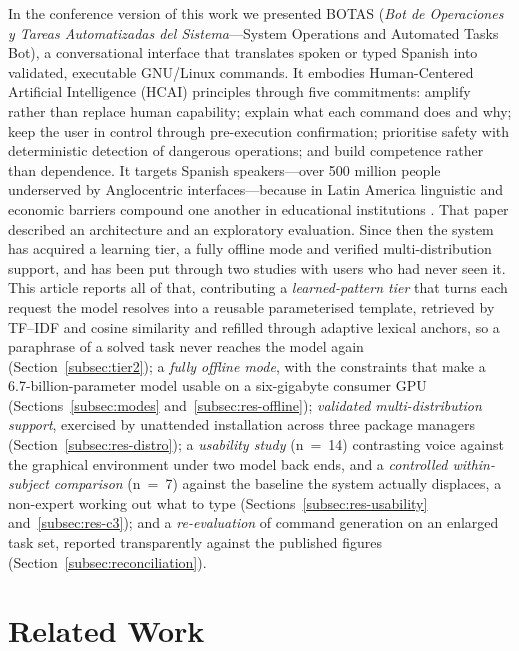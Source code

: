 \documentclass[10pt,a4paper]{article}
\begin{document}
In the conference version of this work \citep{AragonRuiz2026} we presented BOTAS (\textit{Bot de Operaciones y Tareas Automatizadas del Sistema}---System Operations and Automated Tasks Bot), a conversational interface that translates spoken or typed Spanish into validated, executable GNU/Linux commands. It embodies Human-Centered Artificial Intelligence (HCAI) principles \citep{Shneiderman2020} through five commitments: amplify rather than replace human capability; explain what each command does and why; keep the user in control through pre-execution confirmation; prioritise safety with deterministic detection of dangerous operations; and build competence rather than dependence. It targets Spanish speakers---over 500 million people underserved by Anglocentric interfaces---because in Latin America linguistic and economic barriers compound one another in educational institutions \citep{Warschauer2004, CEPAL2023}. That paper described an architecture and an exploratory evaluation. Since then the system has acquired a learning tier, a fully offline mode and verified multi-distribution support, and has been put through two studies with users who had never seen it. This article reports all of that, contributing a \emph{learned-pattern tier} that turns each request the model resolves into a reusable parameterised template, retrieved by TF--IDF and cosine similarity and refilled through adaptive lexical anchors, so a paraphrase of a solved task never reaches the model again (Section~\ref{subsec:tier2}); a \emph{fully offline mode}, with the constraints that make a 6.7-billion-parameter model usable on a six-gigabyte consumer GPU (Sections~\ref{subsec:modes} and~\ref{subsec:res-offline}); \emph{validated multi-distribution support}, exercised by unattended installation across three package managers (Section~\ref{subsec:res-distro}); a \emph{usability study} (n~=~14) contrasting voice against the graphical environment under two model back ends, and a \emph{controlled within-subject comparison} (n~=~7) against the baseline the system actually displaces, a non-expert working out what to type (Sections~\ref{subsec:res-usability} and~\ref{subsec:res-c3}); and a \emph{re-evaluation} of command generation on an enlarged task set, reported transparently against the published figures (Section~\ref{subsec:reconciliation}).

\section{Related Work}
\label{sec:related-work}
\end{document}
